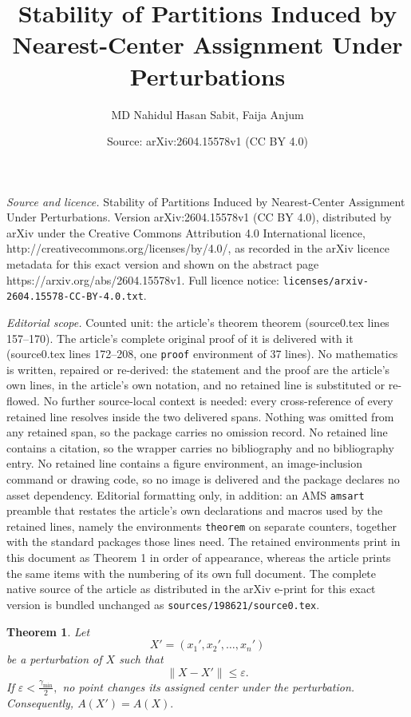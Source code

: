 \documentclass[10pt,a4paper]{amsart}
\title{Stability of Partitions Induced by Nearest-Center Assignment Under Perturbations}
\author{MD Nahidul Hasan Sabit, Faija Anjum}
\date{Source: arXiv:2604.15578v1 (CC BY 4.0)}
\newtheorem{theorem}{Theorem}
\begin{document}
\maketitle

\noindent\emph{Source and licence.} Stability of Partitions Induced by Nearest-Center Assignment Under Perturbations. Version arXiv:2604.15578v1 (CC BY 4.0), distributed by arXiv under the Creative Commons Attribution 4.0 International licence, http://creativecommons.org/licenses/by/4.0/, as recorded in the arXiv licence metadata for this exact version and shown on the abstract page https://arxiv.org/abs/2604.15578v1. Full licence notice: \texttt{licenses/arxiv-2604.15578-CC-BY-4.0.txt}.\par\smallskip

\noindent\textit{Editorial scope.} Counted unit: the article's theorem theorem (source0.tex lines 157--170). The article's complete original proof of it is delivered with it (source0.tex lines 172--208, one \texttt{proof} environment of 37 lines). No mathematics is written, repaired or re-derived: the statement and the proof are the article's own lines, in the article's own notation, and no retained line is substituted or re-flowed.  No further source-local context is needed: every cross-reference of every retained line resolves inside the two delivered spans.  Nothing was omitted from any retained span, so the package carries no omission record.  No retained line contains a citation, so the wrapper carries no bibliography and no bibliography entry.  No retained line contains a figure environment, an image-inclusion command or drawing code, so no image is delivered and the package declares no asset dependency.  Editorial formatting only, in addition: an AMS \texttt{amsart} preamble that restates the article's own declarations and macros used by the retained lines, namely the environments \texttt{theorem} on separate counters, together with the standard packages those lines need.  The retained environments print in this document as Theorem 1 in order of appearance, whereas the article prints the same items with the numbering of its own full document.  The complete native source of the article as distributed in the arXiv e-print for this exact version is bundled unchanged as \texttt{sources/198621/source0.tex}.
\begin{theorem}
Let
\[
X' = (x_1', x_2', \ldots, x_n')
\]
be a perturbation of $X$ such that
\[
\|X - X'\| \le \varepsilon.
\]
If
$\varepsilon < \frac{\gamma_{\min}}{2},$
no point changes its assigned center under the perturbation. Consequently,
$A(X') = A(X).$
\end{theorem}
\end{document}
